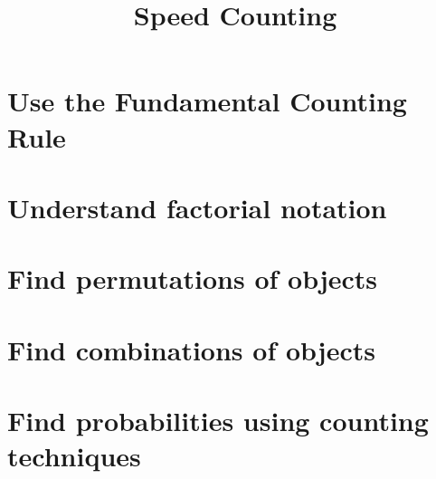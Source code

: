 \documentclass[t]{beamer}
\title{Speed Counting}
\author{}
\date{}
\begin{document}
\begin{frame} 
\maketitle
\end{frame}

\section{Use the Fundamental Counting Rule}




\section{Understand factorial notation}
\section{Find permutations of objects}
\section{Find combinations of objects}
\section{Find probabilities using counting techniques}
\end{document}
